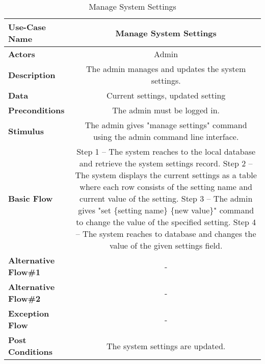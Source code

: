 \begin{table}[H]
     \centering
     \begin{tabular}{|l|C|}
         \hline
          \textbf{Use-Case Name} & Manage System Settings \\
         \hline
          \textbf{Actors} & Admin \\ 
         \hline
          \textbf{Description} & The admin manages and updates the system settings. \\ 
         \hline
          \textbf{Data} & Current settings, updated setting\\ 
         \hline
          \textbf{Preconditions} & 
		  The admin must be logged in. \\
         \hline
          \textbf{Stimulus} & The admin gives "manage settings" command using the admin command line interface. \\ 
         \hline
          \textbf{Basic Flow} & 
          Step 1 -- The system reaches to the local database and retrieve the system settings record. \newline    
          Step 2 -- The system displays the current settings as a table where each row consists of the setting name and current value of the setting. \newline
          Step 3 -- The admin gives "set \{setting name\} \{new value\}" command to change the value of the specified setting. \newline
          Step 4 -- The system reaches to database and changes the value of the given settings field. \\
         \hline
          \textbf{Alternative Flow\#1} &  - \\
         \hline
          \textbf{Alternative Flow\#2} & -\\
         \hline
          \textbf{Exception Flow} & - \\
         \hline
          \textbf{Post Conditions} & The system settings are updated. \\ 
         \hline
     \end{tabular}
     \caption{Manage System Settings}
     \label{tab:manage_system_settings}
 \end{table}